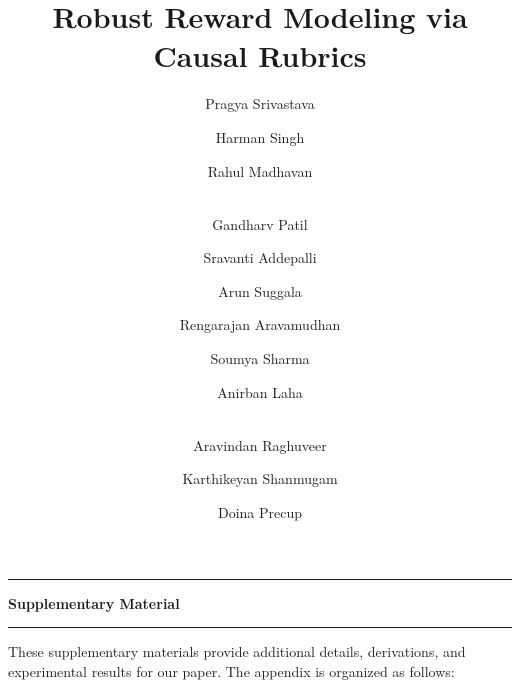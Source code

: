 \documentclass[11pt, letterpaper, logo, copyright]{googledeepmind}
\title{Robust Reward Modeling via Causal Rubrics}
\author[1*]{Pragya Srivastava}
\author[1*]{Harman Singh}
\author[1*]{Rahul Madhavan}
\author[2,3]{\\Gandharv Patil}
\author[1]{Sravanti Addepalli}
\author[1]{Arun Suggala}
\author[1]{Rengarajan Aravamudhan}
\author[1]{Soumya Sharma}
\author[1]{Anirban Laha}
\author[1]{\\Aravindan Raghuveer}
\author[1]{Karthikeyan Shanmugam}
\author[1,3]{Doina Precup}
\affil[1]{Google DeepMind}
\affil[2]{McGill University}
\affil[3]{MILA - Quebec AI Institute}
\affil[*]{Equal Contribution}
\begin{document}
\maketitle















\appendix
\onecolumn

\vspace{1cm}
\hrule
\par\vspace{0.5cm}
{\Large\bfseries\centering 
{Supplementary Material}
\par\vspace{0.5cm}}
\hrule
\vspace{0.5cm}
\noindent These supplementary materials provide additional details, derivations, and experimental results for our paper. The appendix is organized as follows:
\end{document}
